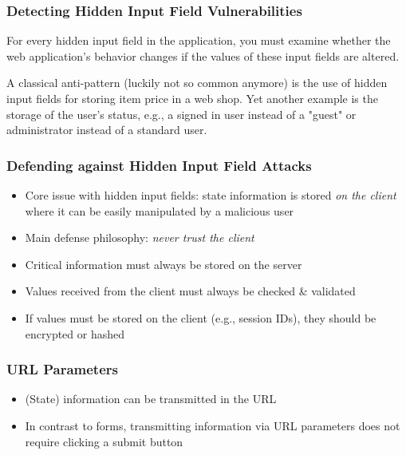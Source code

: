\begin{frame}
    \frametitle{Detecting Hidden Input Field Vulnerabilities}
    For every hidden input field in the application, you must examine whether the web application's behavior changes if the values of these input fields are altered.

    A classical anti-pattern (luckily not so common anymore) is the use of hidden input fields for storing item price in a web shop. Yet another example is the storage of the user's status, e.g., a signed in user instead of a "guest" or administrator instead of a standard user.
\end{frame}

\begin{frame}
    \frametitle{Defending against Hidden Input Field Attacks}
    \begin{itemize}
        \item Core issue with hidden input fields: state information is stored \textit{on the client} where it can be easily manipulated by a malicious user
        \item Main defense philosophy: \textit{never trust the client}
        \item Critical information must always be stored on the server
        \item Values received from the client must always be checked \& validated
        \item If values must be stored on the client (e.g., session IDs), they should be encrypted or hashed
    \end{itemize}     
\end{frame}

\begin{frame}
    \frametitle{URL Parameters}
    \begin{itemize}
        \item (State) information can be transmitted in the URL
        \item In contrast to forms, transmitting information via URL parameters does not require clicking a submit button
    \end{itemize}
\end{frame}

